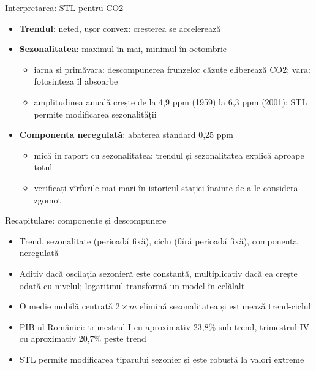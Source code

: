 \begin{frame}{Interpretarea: STL pentru CO2}
\itemsize{\small}
\begin{itemize}
    \item \textbf{Trendul}: neted, ușor convex: creșterea se accelerează
    \item \textbf{Sezonalitatea}: maximul în mai, minimul în octombrie
    \begin{itemize}
        \item iarna și primăvara: descompunerea frunzelor căzute eliberează CO2; vara: fotosinteza îl absoarbe
        \item amplitudinea anuală crește de la 4{,}9 ppm (1959) la 6{,}3 ppm (2001): STL permite modificarea sezonalității
    \end{itemize}
    \item \textbf{Componenta neregulată}: abaterea standard 0{,}25 ppm
    \begin{itemize}
        \item mică în raport cu sezonalitatea: trendul și sezonalitatea explică aproape totul
        \item verificați vîrfurile mai mari în istoricul stației înainte de a le considera zgomot
    \end{itemize}
\end{itemize}
\end{frame}

\begin{frame}{Recapitulare: componente și descompunere}
\itemsize{\small}
\begin{itemize}
    \item Trend, sezonalitate (perioadă fixă), ciclu (fără perioadă fixă), componenta neregulată
    \item Aditiv dacă oscilația sezonieră este constantă, multiplicativ dacă ea crește odată cu nivelul; logaritmul transformă un model în celălalt
    \item O medie mobilă centrată $2 \times m$ elimină sezonalitatea și estimează trend-ciclul
    \item PIB-ul României: trimestrul I cu aproximativ 23{,}8\% sub trend, trimestrul IV cu aproximativ 20{,}7\% peste trend
    \item STL permite modificarea tiparului sezonier și este robustă la valori extreme
\end{itemize}
\end{frame}



